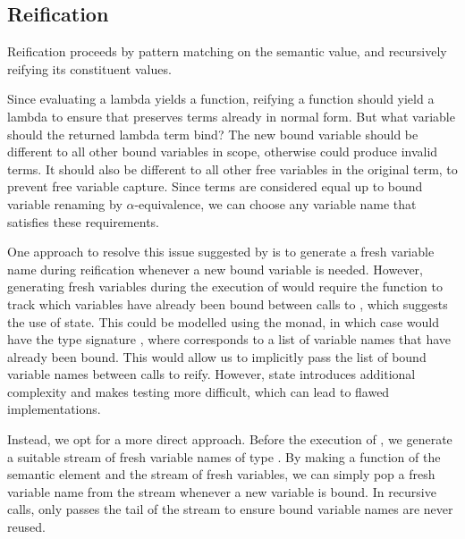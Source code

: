 \subsection{Reification}


Reification proceeds by pattern matching on the semantic value, and recursively reifying its constituent values.

Since evaluating a lambda yields a function, reifying a function should yield a lambda to ensure that  preserves terms already in normal form. But what variable should the returned lambda term bind? The new bound variable should be different to all other bound variables in scope, otherwise  could produce invalid terms. It should also be different to all other free variables in the original term, to prevent free variable capture. Since terms are considered equal up to bound variable renaming by $\alpha$-equivalence, we can choose any variable name that satisfies these requirements. 

One approach to resolve this issue suggested by \cite{slides} is to generate a fresh variable name during reification whenever a new bound variable is needed. However, generating fresh variables during the execution of  would require the function to track which variables have already been bound between calls to , which suggests the use of state. This could be modelled using the  monad, in which case  would have the type signature , where \code{[Name]} corresponds to a list of variable names that have already been bound. This would allow us to implicitly pass the list of bound variable names between calls to reify. However, state introduces additional complexity and makes testing more difficult, which can lead to flawed implementations.


Instead, we opt for a more direct approach. Before the execution of , we generate a suitable stream of fresh variable names of type \code{[Name]}. By making  a function of the semantic element and the stream of fresh variables, we can simply pop a fresh variable name from the stream whenever a new variable is bound. In recursive calls,  only passes the tail of the stream to ensure bound variable names are never reused.

